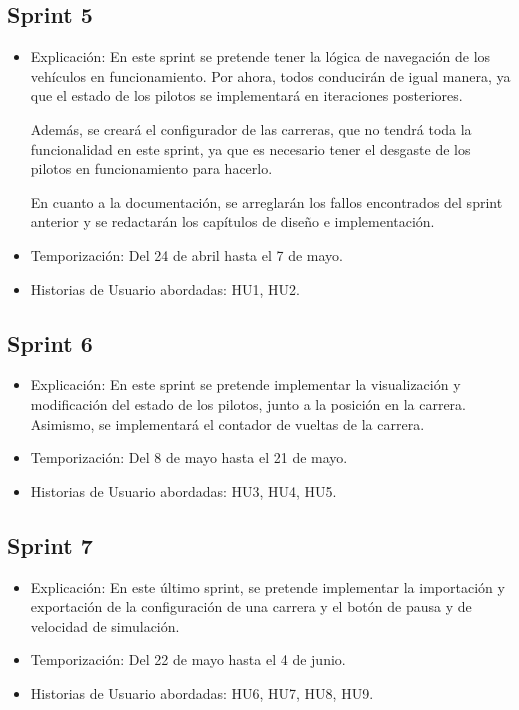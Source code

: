 \subsection{Sprint 5}
\begin{itemize}
    \item Explicación: En este sprint se pretende tener la lógica de navegación de los vehículos en funcionamiento. Por ahora, todos conducirán de igual manera, ya que el estado de los pilotos se implementará en iteraciones posteriores.
    
    Además, se creará el configurador de las carreras, que no tendrá toda la funcionalidad en este sprint, ya que es necesario tener el desgaste de los pilotos en funcionamiento para hacerlo.

    En cuanto a la documentación, se arreglarán los fallos encontrados del sprint anterior y se redactarán los capítulos de diseño e implementación.

    \item Temporización: Del 24 de abril hasta el 7 de mayo.
    \item Historias de Usuario abordadas: HU1, HU2.
\end{itemize}

\newpage

\subsection{Sprint 6}

\begin{itemize}
    \item Explicación: En este sprint se pretende implementar la visualización y modificación del estado de los pilotos, junto a la posición en la carrera. Asimismo, se implementará el contador de vueltas de la carrera.
    \item Temporización: Del 8 de mayo hasta el 21 de mayo.
    \item Historias de Usuario abordadas: HU3, HU4, HU5.
\end{itemize}

\subsection{Sprint 7}

\begin{itemize}
    \item Explicación: En este último sprint, se pretende implementar la importación y exportación de la configuración de una carrera y el botón de pausa y de velocidad de simulación.
    \item Temporización: Del 22 de mayo hasta el 4 de junio.
    \item Historias de Usuario abordadas: HU6, HU7, HU8, HU9.
\end{itemize}


